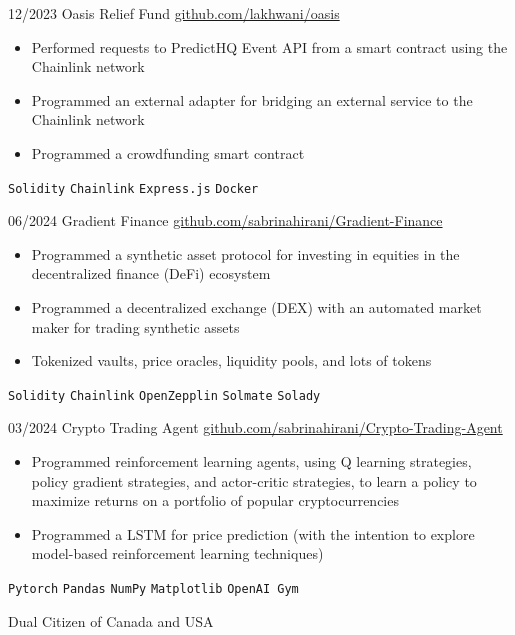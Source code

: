\documentclass[9pt]{developercv} %
\begin{document}
\begin{entrylist}
    \entry
		{12/2023}
		{Oasis Relief Fund}
		{\href{https://github.com/lakhwani/oasis}{github.com/lakhwani/oasis}}
		{
        \vspace{-10pt}
        \begin{itemize}[itemsep=3pt,topsep=0pt,parsep=0pt,partopsep=0pt, leftmargin=-1pt]
            \item Performed requests to PredictHQ Event API from a smart contract using the Chainlink network
            \item Programmed an external adapter for bridging an external service to the Chainlink network
            \item Programmed a crowdfunding smart contract
        \end{itemize} 
        \texttt{Solidity} \slashsep \texttt{Chainlink} \slashsep \texttt{Express.js} \slashsep \texttt{Docker}
        }
    \entry
		{06/2024}
		{Gradient Finance}
		{\href{https://github.com/sabrinahirani/Gradient-Finance}{github.com/sabrinahirani/Gradient-Finance}}
		{
        \vspace{-10pt}
        \begin{itemize}[itemsep=3pt,topsep=0pt,parsep=0pt,partopsep=0pt, leftmargin=-1pt]
            \item Programmed a synthetic asset protocol for investing in equities in the decentralized finance (DeFi) ecosystem
            \item Programmed a decentralized exchange (DEX) with an automated market maker for trading synthetic assets
            \item Tokenized vaults, price oracles, liquidity pools, and lots of tokens
        \end{itemize} 
        \vspace{5pt}
        \texttt{Solidity} \slashsep \texttt{Chainlink} \slashsep \texttt{OpenZepplin} \slashsep \texttt{Solmate} \slashsep \texttt{Solady}
        }
    \entry
		{03/2024}
		{Crypto Trading Agent}
		{\href{https://github.com/sabrinahirani/Crypto-Trading-Agent}{github.com/sabrinahirani/Crypto-Trading-Agent}}
		{
        \vspace{-10pt}
        \begin{itemize}[itemsep=3pt,topsep=0pt,parsep=0pt,partopsep=0pt, leftmargin=-1pt]
            \item Programmed reinforcement learning agents, using Q learning strategies, policy gradient strategies, and actor-critic strategies, to learn a policy to maximize returns on a portfolio of popular cryptocurrencies
            \item Programmed a LSTM for price prediction (with the intention to explore model-based reinforcement learning techniques)
        \end{itemize} 
        \vspace{5pt}
        \texttt{Pytorch} \slashsep \texttt{Pandas} \slashsep \texttt{NumPy} \slashsep \texttt{Matplotlib} \slashsep \texttt{OpenAI Gym}
        }
\end{entrylist}

\begin{center}
Dual Citizen of Canada and USA
\end{center}

\end{document}
